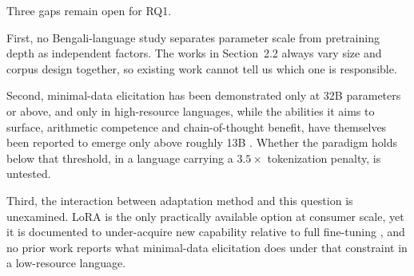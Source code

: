 Three gaps remain open for RQ1.

First, no Bengali-language study separates parameter scale from pretraining
depth as independent factors. The works in Section~2.2 always vary size and
corpus design together, so existing work cannot tell us which one is
responsible.

Second, minimal-data elicitation has been demonstrated only at 32B parameters or
above, and only in high-resource languages, while the abilities it aims to
surface, arithmetic competence and chain-of-thought benefit, have themselves
been reported to emerge only above roughly 13B \parencite{wei2022emergent}. %
Whether the paradigm holds below that threshold, in a language carrying a
$3.5\times$ tokenization penalty, is untested.

Third, the interaction between adaptation method and this question is
unexamined. LoRA is the only practically available option at consumer scale, yet
it is documented to under-acquire new capability relative to full fine-tuning
\parencite{biderman2024lora}, %
and no prior work reports what minimal-data elicitation does under that
constraint in a low-resource language.


